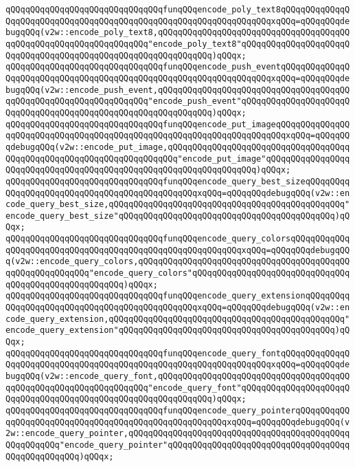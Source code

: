 \verb|qQQqqQQqqQQqqQQqqQQqqQQqqQQqqQQqfunqQQqencode_poly_text8qQQqqQQqqQQqqQQqqQQqqQQqqQQqqQQqqQQqqQQqqQQqqQQqqQQqqQQqqQQqqQQqqQQqxqQQq=qQQqqQQqdebugqQQq(v2w::encode_poly_text8,qQQqqQQqqQQqqQQqqQQqqQQqqQQqqQQqqQQqqQQqqQQqqQQqqQQqqQQqqQQqqQQqqQQq"encode_poly_text8"qQQqqQQqqQQqqQQqqQQqqQQqqQQqqQQqqQQqqQQqqQQqqQQqqQQqqQQqqQQqqQQq)qQQqx;|\newline
\verb|qQQqqQQqqQQqqQQqqQQqqQQqqQQqqQQqfunqQQqencode_push_eventqQQqqQQqqQQqqQQqqQQqqQQqqQQqqQQqqQQqqQQqqQQqqQQqqQQqqQQqqQQqqQQqqQQqxqQQq=qQQqqQQqdebugqQQq(v2w::encode_push_event,qQQqqQQqqQQqqQQqqQQqqQQqqQQqqQQqqQQqqQQqqQQqqQQqqQQqqQQqqQQqqQQqqQQq"encode_push_event"qQQqqQQqqQQqqQQqqQQqqQQqqQQqqQQqqQQqqQQqqQQqqQQqqQQqqQQqqQQqqQQq)qQQqx;|\newline
\verb|qQQqqQQqqQQqqQQqqQQqqQQqqQQqqQQqfunqQQqencode_put_imageqQQqqQQqqQQqqQQqqQQqqQQqqQQqqQQqqQQqqQQqqQQqqQQqqQQqqQQqqQQqqQQqqQQqqQQqxqQQq=qQQqqQQqdebugqQQq(v2w::encode_put_image,qQQqqQQqqQQqqQQqqQQqqQQqqQQqqQQqqQQqqQQqqQQqqQQqqQQqqQQqqQQqqQQqqQQqqQQq"encode_put_image"qQQqqQQqqQQqqQQqqQQqqQQqqQQqqQQqqQQqqQQqqQQqqQQqqQQqqQQqqQQqqQQqqQQq)qQQqx;|\newline
\verb|qQQqqQQqqQQqqQQqqQQqqQQqqQQqqQQqfunqQQqencode_query_best_sizeqQQqqQQqqQQqqQQqqQQqqQQqqQQqqQQqqQQqqQQqqQQqqQQqxqQQq=qQQqqQQqdebugqQQq(v2w::encode_query_best_size,qQQqqQQqqQQqqQQqqQQqqQQqqQQqqQQqqQQqqQQqqQQqqQQq"encode_query_best_size"qQQqqQQqqQQqqQQqqQQqqQQqqQQqqQQqqQQqqQQqqQQq)qQQqx;|\newline
\verb|qQQqqQQqqQQqqQQqqQQqqQQqqQQqqQQqfunqQQqencode_query_colorsqQQqqQQqqQQqqQQqqQQqqQQqqQQqqQQqqQQqqQQqqQQqqQQqqQQqqQQqqQQqxqQQq=qQQqqQQqdebugqQQq(v2w::encode_query_colors,qQQqqQQqqQQqqQQqqQQqqQQqqQQqqQQqqQQqqQQqqQQqqQQqqQQqqQQqqQQq"encode_query_colors"qQQqqQQqqQQqqQQqqQQqqQQqqQQqqQQqqQQqqQQqqQQqqQQqqQQqqQQq)qQQqx;|\newline
\verb|qQQqqQQqqQQqqQQqqQQqqQQqqQQqqQQqfunqQQqencode_query_extensionqQQqqQQqqQQqqQQqqQQqqQQqqQQqqQQqqQQqqQQqqQQqqQQqxqQQq=qQQqqQQqdebugqQQq(v2w::encode_query_extension,qQQqqQQqqQQqqQQqqQQqqQQqqQQqqQQqqQQqqQQqqQQqqQQq"encode_query_extension"qQQqqQQqqQQqqQQqqQQqqQQqqQQqqQQqqQQqqQQqqQQq)qQQqx;|\newline
\verb|qQQqqQQqqQQqqQQqqQQqqQQqqQQqqQQqfunqQQqencode_query_fontqQQqqQQqqQQqqQQqqQQqqQQqqQQqqQQqqQQqqQQqqQQqqQQqqQQqqQQqqQQqqQQqqQQqxqQQq=qQQqqQQqdebugqQQq(v2w::encode_query_font,qQQqqQQqqQQqqQQqqQQqqQQqqQQqqQQqqQQqqQQqqQQqqQQqqQQqqQQqqQQqqQQqqQQq"encode_query_font"qQQqqQQqqQQqqQQqqQQqqQQqqQQqqQQqqQQqqQQqqQQqqQQqqQQqqQQqqQQqqQQq)qQQqx;|\newline
\verb|qQQqqQQqqQQqqQQqqQQqqQQqqQQqqQQqfunqQQqencode_query_pointerqQQqqQQqqQQqqQQqqQQqqQQqqQQqqQQqqQQqqQQqqQQqqQQqqQQqqQQqxqQQq=qQQqqQQqdebugqQQq(v2w::encode_query_pointer,qQQqqQQqqQQqqQQqqQQqqQQqqQQqqQQqqQQqqQQqqQQqqQQqqQQqqQQq"encode_query_pointer"qQQqqQQqqQQqqQQqqQQqqQQqqQQqqQQqqQQqqQQqqQQqqQQqqQQq)qQQqx;|\newline
